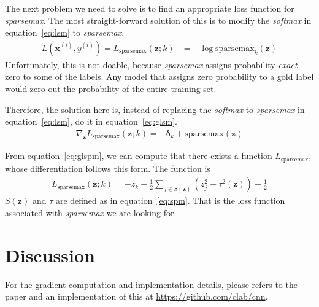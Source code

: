 \documentclass[11pt]{article}
\begin{document}
The next problem we need to solve is to find an appropriate loss function for \textit{sparsemax}. The most straight-forward solution of this is to modify the \textit{softmax} in equation~\ref{eq:lsm} to \textit{sparsemax}.
\begin{align}
L(\boldsymbol{x}^{(i)}, y^{(i)}) = L_{\text{sparsemax}}(\boldsymbol{z}; k) & = -\log \text{sparsemax}_{k}(\boldsymbol{z}) \label{eq:lspmw}
\end{align}
Unfortunately, this is not doable, because \textit{sparsemax} assigns probability \textit{exact} zero to some of the labels. Any model that assigns zero probability to a gold label would zero out the probability of the entire training set.

Therefore, the solution here is, instead of replacing the \textit{softmax} to \textit{sparsemax} in equation~\ref{eq:lsm}, do it in equation~\ref{eq:glsm}.
\begin{align}
\nabla_{\boldsymbol{z}}L_{\text{sparsemax}}(\boldsymbol{z}; k) = - \boldsymbol{\delta}_k + \text{sparsemax}(\boldsymbol{z})\label{eq:glspm}
\end{align}

From equation~\ref{eq:glspm}, we can compute that there exists a function $L_{\text{sparsemax}}$, whose differentiation follows this form. The function is
\begin{align}
L_{\text{sparsemax}}(\boldsymbol{z}; k) = -z_{k} + \frac{1}{2}\sum_{j \in S(\boldsymbol{z})}(z_{j}^2 - \tau^2(\boldsymbol{z})) + \frac{1}{2}
\end{align}
$S(\boldsymbol{z})$ and $\tau$ are defined as in equation~\ref{eq:spm}. That is the loss function associated with \textit{sparsemax} we are looking for.

\section{Discussion}
For the gradient computation and implementation details, please refers to the paper and an implementation of this at \url{https://github.com/clab/cnn}.



\end{document}
